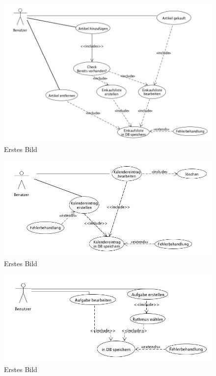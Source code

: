 \begin{figure}[hHtbp] 
  \centering
     \includegraphics[width=\textwidth]{anhang/usecases/diagramme/teamprojekt14_uc_Einkaufsliste.jpg}
  \caption{Erstes Bild}
  \label{fig:Bild1}
\end{figure}

\begin{figure}[H] 
  \centering
     \includegraphics[width=\textwidth]{anhang/usecases/diagramme/teamprojekt14_uc_Kalender.jpg}
  \caption{Erstes Bild}
  \label{fig:Bild1}
\end{figure}

\begin{figure}[H] 
  \centering
     \includegraphics[width=\textwidth]{anhang/usecases/diagramme/teamprojekt14_uc_Putzplan.jpg}
  \caption{Erstes Bild}
  \label{fig:Bild1}
\end{figure}

